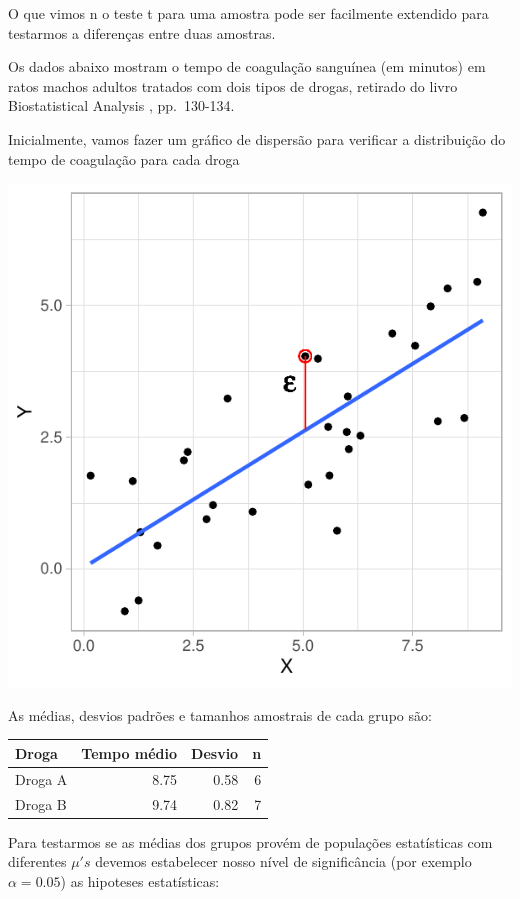 \documentclass[
]{book}
\begin{document}
O que vimos n o teste t para uma amostra pode ser facilmente extendido para testarmos a diferenças entre duas amostras.

Os dados abaixo mostram o tempo de coagulação sanguínea (em minutos) em ratos machos adultos tratados com dois tipos de drogas, retirado do livro Biostatistical Analysis \citep{zar2010biostatistical}, pp.~130-134.

Inicialmente, vamos fazer um gráfico de dispersão para verificar a distribuição do tempo de coagulação para cada droga

\begin{center}\includegraphics{probest-cambientais_files/figure-latex/unnamed-chunk-140-1} \end{center}

As médias, desvios padrões e tamanhos amostrais de cada grupo são:

\begin{tabular}{l|r|r|r}
\hline
Droga & Tempo médio & Desvio & n\\
\hline
Droga A & 8.75 & 0.58 & 6\\
\hline
Droga B & 9.74 & 0.82 & 7\\
\hline
\end{tabular}

Para testarmos se as médias dos grupos provém de populações estatísticas com diferentes \(\mu's\) devemos estabelecer nosso nível de significância (por exemplo \(\alpha = 0.05\)) as hipoteses estatísticas:
\end{document}
